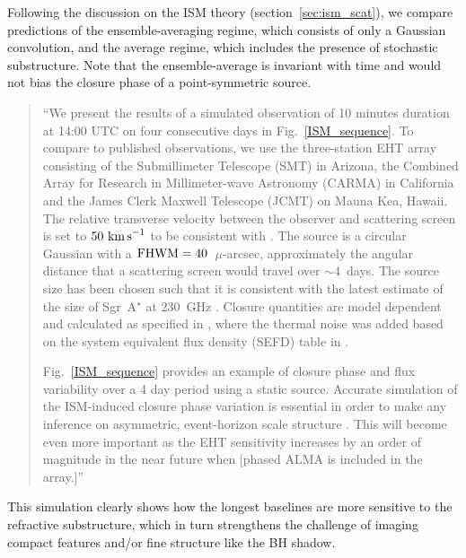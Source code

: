 Following the discussion on the ISM theory (section~\ref{sec:ism_scat}), we compare predictions of the ensemble-averaging regime, which consists of only a Gaussian convolution, and the average regime, which includes the presence of stochastic substructure. Note that the ensemble-average is invariant with time and would not bias the closure phase of a point-symmetric source.
\begin{quotation}  
``We present the results of a simulated observation of 10 minutes duration at 14:00 UTC on four consecutive days in Fig.~\ref{ISM_sequence}. To compare to published observations, we use the three-station EHT array consisting of the Submillimeter Telescope (SMT) in Arizona, the Combined Array for Research in Millimeter-wave Astronomy (CARMA) in California and the James Clerk Maxwell Telescope (JCMT) on Mauna Kea, Hawaii. The relative transverse velocity between the observer and scattering screen is set to $50~\rm{km\,s}^{-1}$ to be consistent with \citet{Ortiz_2016}. The source is a circular Gaussian with a $\rm{FHWM}=40$~$\mu$-arcsec, approximately the angular distance that a scattering screen would travel over $\sim 4$~days. The source size has been chosen such that it is consistent with the latest estimate of the size of Sgr~A$^\star$ at $230$~GHz \citep{Fish_2011}.  Closure quantities are model dependent and calculated as specified in \citet{Rogers_1995}, where the thermal noise was added based on the system equivalent flux density (SEFD) table in \citep{Lu_2014}.




Fig.~\ref{ISM_sequence} provides an example of closure phase and flux variability over a 4 day period using a static source. Accurate simulation of the ISM-induced closure phase variation is essential in order to make any inference on asymmetric, event-horizon scale structure \citep[e.g.][]{Fish_2016,Ortiz_2016}. This will become even more important as the EHT sensitivity increases by an order of magnitude in the near future when [phased ALMA is included in the array.]''
\citep{Blecher_2016} 
\end{quotation}

This simulation clearly shows how the longest baselines are more sensitive to the refractive substructure, which in turn strengthens the challenge of imaging compact features and/or fine structure like the BH shadow. 


